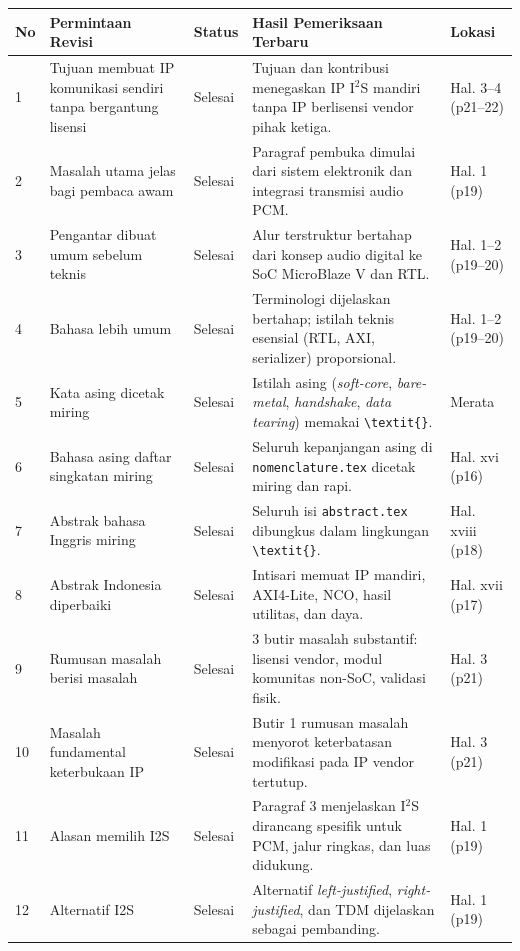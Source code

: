 \documentclass[11pt,a4paper]{article}
\begin{document}
\small
\begin{longtable}{@{}p{0.6cm} p{4.4cm} p{1.5cm} p{7.2cm} p{2.3cm}@{}}
\toprule
\textbf{No} & \textbf{Permintaan Revisi} & \textbf{Status} & \textbf{Hasil Pemeriksaan Terbaru} & \textbf{Lokasi} \\
\midrule
\endhead
1 & Tujuan membuat IP komunikasi sendiri tanpa bergantung lisensi & Selesai & Tujuan dan kontribusi menegaskan IP I$^2$S mandiri tanpa IP berlisensi vendor pihak ketiga. & Hal. 3--4 (p21--22) \\
2 & Masalah utama jelas bagi pembaca awam & Selesai & Paragraf pembuka dimulai dari sistem elektronik dan integrasi transmisi audio PCM. & Hal. 1 (p19) \\
3 & Pengantar dibuat umum sebelum teknis & Selesai & Alur terstruktur bertahap dari konsep audio digital ke SoC MicroBlaze V dan RTL. & Hal. 1--2 (p19--20) \\
4 & Bahasa lebih umum & Selesai & Terminologi dijelaskan bertahap; istilah teknis esensial (RTL, AXI, serializer) proporsional. & Hal. 1--2 (p19--20) \\
5 & Kata asing dicetak miring & Selesai & Istilah asing (\textit{soft-core}, \textit{bare-metal}, \textit{handshake}, \textit{data tearing}) memakai \texttt{\textbackslash textit\{\}}. & Merata \\
6 & Bahasa asing daftar singkatan miring & Selesai & Seluruh kepanjangan asing di \texttt{nomenclature.tex} dicetak miring dan rapi. & Hal. xvi (p16) \\
7 & Abstrak bahasa Inggris miring & Selesai & Seluruh isi \texttt{abstract.tex} dibungkus dalam lingkungan \texttt{\textbackslash textit\{\}}. & Hal. xviii (p18) \\
8 & Abstrak Indonesia diperbaiki & Selesai & Intisari memuat IP mandiri, AXI4-Lite, NCO, hasil utilitas, dan daya. & Hal. xvii (p17) \\
9 & Rumusan masalah berisi masalah & Selesai & 3 butir masalah substantif: lisensi vendor, modul komunitas non-SoC, validasi fisik. & Hal. 3 (p21) \\
10 & Masalah fundamental keterbukaan IP & Selesai & Butir 1 rumusan masalah menyorot keterbatasan modifikasi pada IP vendor tertutup. & Hal. 3 (p21) \\
11 & Alasan memilih I2S & Selesai & Paragraf 3 menjelaskan I$^2$S dirancang spesifik untuk PCM, jalur ringkas, dan luas didukung. & Hal. 1 (p19) \\
12 & Alternatif I2S & Selesai & Alternatif \textit{left-justified}, \textit{right-justified}, dan TDM dijelaskan sebagai pembanding. & Hal. 1 (p19) \\

\end{longtable}
\end{document}
